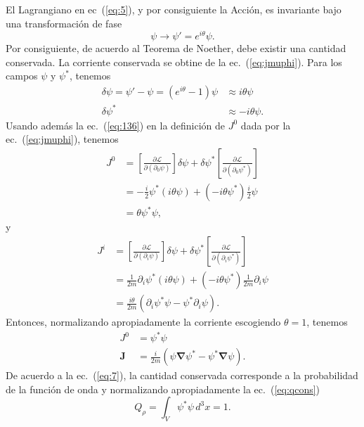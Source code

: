 El Lagrangiano en ec~(\ref{eq:5}), y por consiguiente la Acci\'on, es invariante bajo una transformaci\'on de fase
\begin{equation}
  \label{eq:6}
  \psi\to\psi'=e^{i\theta}\psi.
\end{equation}
Por consiguiente, de acuerdo al Teorema de Noether, debe existir una cantidad conservada. La corriente conservada se obtine de la ec.~(\ref{eq:jmuphi}). Para los campos $\psi$ y $\psi^*$, tenemos
\begin{align}
  \delta\psi=\psi'-\psi=(e^{i\theta}-1)\psi&\approx i\theta\psi\\
  \delta\psi^*&\approx-i\theta\psi.
\end{align}
Usando adem\'as la ec.~(\ref{eq:136}) en la definici\'on de $J^0$ dada por la ec.~(\ref{eq:jmuphi}), tenemos
\begin{align}
  \label{eq:135}
  J^0&=\left[\frac{\partial\mathcal{L}}{\partial(\partial_0\psi)}\right]\delta\psi
  +\delta\psi^*\left[\frac{\partial\mathcal{L}}{\partial(\partial_0\psi^*)}\right]\nonumber\\
  &=-\frac{i}{2}\psi^*(i\theta\psi)+(-i\theta\psi^*)\frac{i}{2}\psi\nonumber\\
  &=\theta\psi^*\psi,
\end{align}
y
\begin{align}
  \label{eq:134}
  J^i&=\left[\frac{\partial\mathcal{L}}{\partial(\partial_i\psi)}\right]\delta\psi
  +\delta\psi^*\left[\frac{\partial\mathcal{L}}{\partial(\partial_i\psi^*)}\right]\nonumber\\
  &=\frac{1}{2m}\partial_i\psi^*(i\theta\psi)+(-i\theta\psi^*)\frac{1}{2m}\partial_i\psi\nonumber\\
  &=\frac{i\theta}{2m}\left(\partial_i\psi^*\psi-\psi^*\partial_i\psi \right).
\end{align}
Entonces, normalizando apropiadamente la corriente escogiendo $\theta=1$, tenemos
\begin{align}
  \label{eq:7}
  J^0&=\psi^*\psi\\
  \mathbf{J}&=\frac{i}{2m}
  \left(
    \psi\boldsymbol{\nabla}\psi^*-\psi^*\boldsymbol{\nabla}\psi
  \right).
\end{align}
De acuerdo a la ec.~(\ref{eq:7}), la cantidad conservada corresponde a la probabilidad de la funci\'on de onda y normalizando apropiadamente la ec.~(\ref{eq:qcons})
\begin{equation}
  \label{eq:57}
Q_\rho=  \int_V \psi^*\psi \,d^3x=1.
\end{equation}


